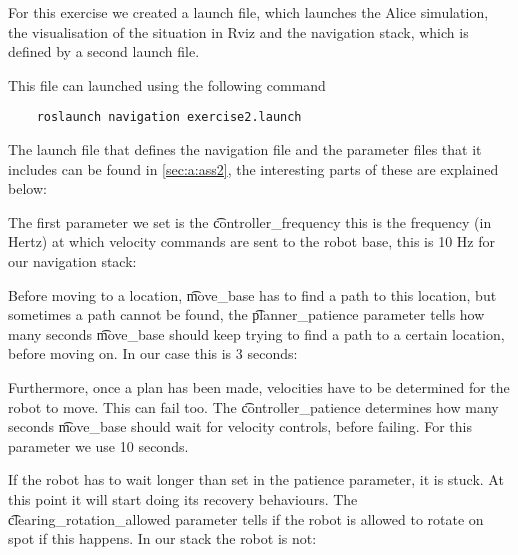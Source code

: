 
For this exercise we created a launch file, which launches the Alice simulation, the visualisation of the situation in Rviz and the navigation stack, which is defined by a second launch file.



This file can launched using the following command

\begin{lstlisting}
	roslaunch navigation exercise2.launch
\end{lstlisting}

The launch file that defines the navigation file and the parameter files that it includes can be found in \cref{sec:a:ass2}, the interesting parts of these are explained below:

The first parameter we set is the \t{controller\_frequency} this is the frequency (in Hertz) at which velocity commands are sent to the robot base, this is 10 Hz for our navigation stack:



Before moving to a location, \t{move\_base} has to find a path to this location, but sometimes a path cannot be found, the \t{planner\_patience} parameter tells how many seconds \t{move\_base} should keep trying to find a path to a certain location, before moving on. In our case this is 3 seconds:



Furthermore, once a plan has been made, velocities have to be determined for the robot to move. This can fail too. The \t{controller\_patience} determines how many seconds \t{move\_base} should wait for velocity controls, before failing. For this parameter we use 10 seconds.



If the robot has to wait longer than set in the patience parameter, it is stuck. At this point it will start doing its recovery behaviours. The \t{clearing\_rotation\_allowed} parameter tells if the robot is allowed to rotate on spot if this happens. In our stack the robot is not:

